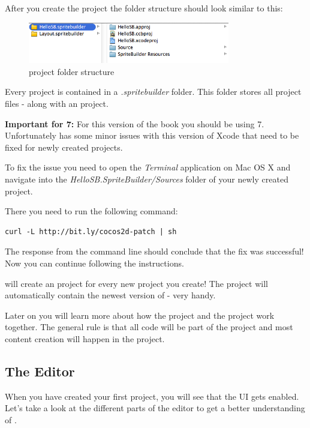 After you create the project the folder structure should look similar
to this:
\begin{figure}[H]
		\centering
		\includegraphics[width=250pt]{images/cocos2d/setup/project_structure.png}     
		\caption{\SB{} project folder structure}
\end{figure}

Every \SB{} project is contained in a \textit{.spritebuilder} folder. This
folder stores all \SB{} project files - along with an \xcode{} project. 

\begin{leftbar}
\textbf{Important for \xcode{} 7:} For this version of the book you should be
using \xcode{} 7. Unfortunately \SB{} has some minor issues with this version of Xcode
that need to be fixed for newly created projects.

To fix the issue you need to open the \textit{Terminal} application on Mac OS X
and navigate into the \textit{HelloSB.SpriteBuilder/Sources} folder of your
newly created project.

There you need to run the following command:
\begin{lstlisting}
curl -L http://bit.ly/cocos2d-patch | sh
\end{lstlisting}

The response from the command line should conclude that the fix was successful!
Now you can continue following the instructions.
\end{leftbar}

\begin{details} 
\SB{} will create an \xcode{} project for every new project you create! The
\xcode{} project will automatically contain the newest version of \cocos{} -
very handy.
\end{details}


Later on you will learn more about how the \SB{} project and the \xcode{}
project work together. The general rule is that all code will be part of the
\xcode{} project and most content creation will happen in the \SB{} project.

\subsection{The Editor}
When you have created your first \SB{} project, you will see that the \SB{} UI
gets enabled. Let's take a look at the different parts of the editor to get a
better understanding of \SB{}.

